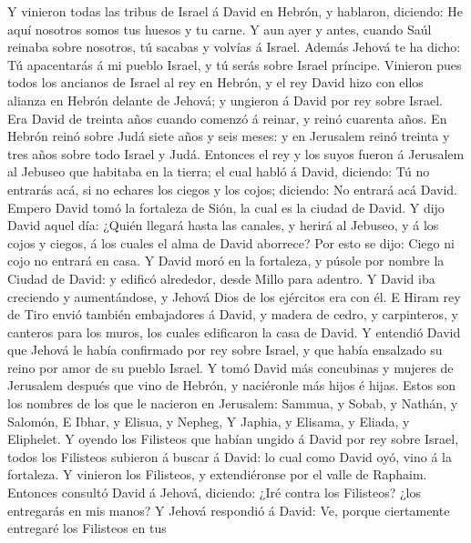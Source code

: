  Y vinieron todas las tribus de Israel á David en Hebrón,
y hablaron, diciendo: He aquí nosotros somos tus huesos y tu carne.
 Y aun ayer y antes, cuando Saúl reinaba sobre nosotros,
tú sacabas y volvías á Israel. Además Jehová te ha dicho: Tú apacentarás
á mi pueblo Israel, y tú serás sobre Israel príncipe. 
Vinieron pues todos los ancianos de Israel al rey en Hebrón, y el rey
David hizo con ellos alianza en Hebrón delante de Jehová; y ungieron á
David por rey sobre Israel.  Era David de treinta años
cuando comenzó á reinar, y reinó cuarenta años.  En Hebrón
reinó sobre Judá siete años y seis meses: y en Jerusalem reinó treinta y
tres años sobre todo Israel y Judá.  Entonces el rey y los
suyos fueron á Jerusalem al Jebuseo que habitaba en la tierra; el cual
habló á David, diciendo: Tú no entrarás acá, si no echares los ciegos y
los cojos; diciendo: No entrará acá David.  Empero David
tomó la fortaleza de Sión, la cual es la ciudad de David. 
Y dijo David aquel día: ¿Quién llegará hasta las canales, y herirá al
Jebuseo, y á los cojos y ciegos, á los cuales el alma de David aborrece?
Por esto se dijo: Ciego ni cojo no entrará en casa.  Y
David moró en la fortaleza, y púsole por nombre la Ciudad de David: y
edificó alrededor, desde Millo para adentro.  Y David iba
creciendo y aumentándose, y Jehová Dios de los ejércitos era con él.
 E Hiram rey de Tiro envió también embajadores á David, y
madera de cedro, y carpinteros, y canteros para los muros, los cuales
edificaron la casa de David.  Y entendió David que Jehová
le había confirmado por rey sobre Israel, y que había ensalzado su reino
por amor de su pueblo Israel.  Y tomó David más
concubinas y mujeres de Jerusalem después que vino de Hebrón, y
naciéronle más hijos é hijas.  Estos son los nombres de
los que le nacieron en Jerusalem: Sammua, y Sobab, y Nathán, y Salomón,
 E Ibhar, y Elisua, y Nepheg,  Y Japhia, y
Elisama, y Eliada, y Eliphelet.  Y oyendo los Filisteos
que habían ungido á David por rey sobre Israel, todos los Filisteos
subieron á buscar á David: lo cual como David oyó, vino á la fortaleza.
 Y vinieron los Filisteos, y extendiéronse por el valle
de Raphaim.  Entonces consultó David á Jehová, diciendo:
¿Iré contra los Filisteos? ¿los entregarás en mis manos? Y Jehová
respondió á David: Ve, porque ciertamente entregaré los Filisteos en tus
